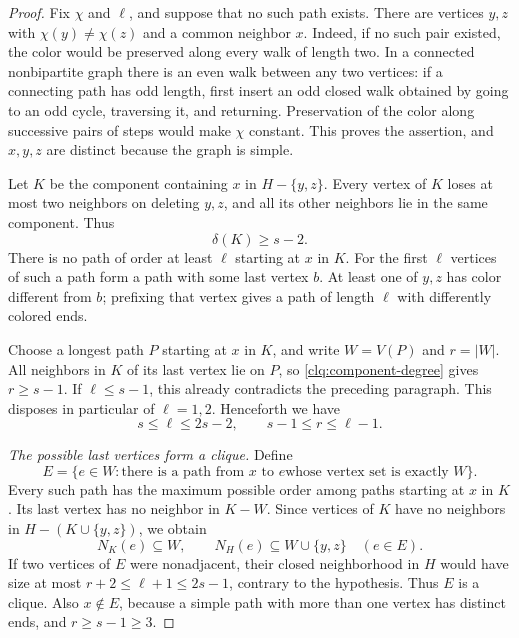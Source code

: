 \begin{proof}
Fix $\chi$ and $\ell$, and suppose that no such path exists.
There are vertices $y,z$ with $\chi(y)\ne\chi(z)$ and a common
neighbor $x$.  Indeed, if no such pair existed, the color would be
preserved along every walk of length two.  In a connected nonbipartite
graph there is an even walk between any two vertices: if a connecting
path has odd length, first insert an odd closed walk obtained by going
to an odd cycle, traversing it, and returning.  Preservation of the
color along successive pairs of steps would make $\chi$ constant.
This proves the assertion, and $x,y,z$ are distinct because the graph
is simple.

Let $K$ be the component containing $x$ in $H-\{y,z\}$.
Every vertex of $K$ loses at most two neighbors on deleting $y,z$,
and all its other neighbors lie in the same component.  Thus
\begin{equation}\label{clq:component-degree}
 \delta(K)\ge s-2.
\end{equation}
There is no path of order at least $\ell$ starting at $x$ in $K$.
For the first $\ell$ vertices of such a path form a path with some
last vertex $b$.  At least one of $y,z$ has color different from $b$;
prefixing that vertex gives a path of length $\ell$ with differently
colored ends.

Choose a longest path $P$ starting at $x$ in $K$, and write
$W=V(P)$ and $r=|W|$.  All neighbors in $K$ of its last vertex lie
on $P$, so \eqref{clq:component-degree} gives $r\ge s-1$.
If $\ell\le s-1$, this already contradicts the preceding paragraph.
This disposes in particular of $\ell=1,2$.  Henceforth we have
\begin{equation}\label{clq:path-order}
 s\le\ell\le 2s-2,
 \qquad s-1\le r\le\ell-1.
\end{equation}

\medskip
\noindent\emph{The possible last vertices form a clique.}
Define
\[
 E=\{e\in W:\text{there is a path from $x$ to $e$
 whose vertex set is exactly $W$}\}.
\]
Every such path has the maximum possible order among paths starting
at $x$ in $K$.  Its last vertex has no neighbor in $K-W$.
Since vertices of $K$ have no neighbors in
$H-(K\cup\{y,z\})$, we obtain
\begin{equation}\label{clq:endpoint-neighbors}
 N_K(e)\subseteq W,
 \qquad N_H(e)\subseteq W\cup\{y,z\}
 \quad(e\in E).
\end{equation}
If two vertices of $E$ were nonadjacent, their closed neighborhood
in $H$ would have size at most
$r+2\le\ell+1\le 2s-1$, contrary to the hypothesis.
Thus $E$ is a clique.  Also $x\notin E$, because a simple path with
more than one vertex has distinct ends, and $r\ge s-1\ge3$.


\end{proof}
